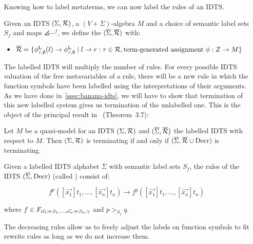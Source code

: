 Knowing how to label metaterms, we can now label the rules of an
IDTS.

\begin{definition}
  Given an IDTS $(\Sigma, \mathcal{R})$, a $(V+\Sigma)$-algebra $M$ and a choice of
  semantic label sets $S_f$ and maps $\angles{-}^f$, we define the
   $(\overline{\Sigma}, \overline{\mathcal{R}})$
  with:

  \begin{itemize}
  \item
    $\overline{\mathcal{R}} = \{ \phi^{\mathrm{L}}_{\tau,\emptyset}(l) \to
    \phi^{\mathrm{L}}_{\tau,\emptyset}\mid l \to r : \tau \in \mathcal{R},
    \text{term-generated assignment } \phi : Z \to M \}$
  \end{itemize}
\end{definition}

The labelled IDTS will multiply the number of rules. For every possible
IDTS valuation of the free metavariables of a rule, there will be a new
rule in which the function symbols have been labelled using the
interpretations of their arguments. As we have done
in~\ref{ssec:banana-idts}, we will have to show that termination of this
new labelled system gives us termination of the unlabelled one. This is the
object of the principal result in~\cite{hamana2007higher} (Theorem~3.7):

\begin{theorem}\label{thm:semantic-labelling}

  Let $M$ be a quasi-model for an IDTS $(\Sigma, \mathcal{R})$ and
  $(\overline{\Sigma}, \overline{\mathcal{R}})$ the labelled IDTS with respect to
  $M$. Then $(\Sigma, \mathcal{R})$ is terminating if and only if
  $(\overline{\Sigma}, \overline{\mathcal{R}} \cup \mathrm{Decr})$ is terminating.
\end{theorem}

\begin{definition}
  Given a labelled IDTS alphabet $\overline{\Sigma}$ with semantic label
  sets $S_f$, the rules of the IDTS $(\overline{\Sigma}, \mathrm{Decr})$ (called
  ) consist of:

  $$
  f^p([\vec{x_1}] t_1, \ldots, [\vec{x_n}] t_n) \longrightarrow f^q([\vec{x_1}] t_1, \ldots, [\vec{x_n}] t_n)
  $$

  where
  $f \in F_{\vec{\alpha_1} \Rightarrow \beta_1, \ldots, \vec{\alpha_n} \Rightarrow \beta_n,
    \gamma}$ and $p >_{S_f} q$.
\end{definition}

The decreasing rules allow us to freely adjust the labels on function
symbols to fit rewrite rules as long as we do not increase them.


